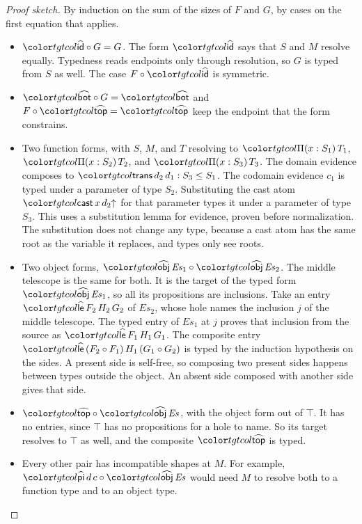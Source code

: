 \begin{proof}[Proof sketch]
By induction on the sum of the sizes of $F$ and $G$, by cases on the first equation that applies.
\begin{itemize}
\item $\form{id} \circ G = G$. The form $\form{id}$ says that $S$ and $M$ resolve equally. Typedness reads endpoints only through resolution, so $G$ is typed from $S$ as well. The case $F \circ \form{id}$ is symmetric.
\item $\form{bot} \circ G = \form{bot}$ and $F \circ \form{top} = \form{top}$ keep the endpoint that the form constrains.
\item Two function forms, with $S$, $M$, and $T$ resolving to $\pit{S_1}{T_1}$, $\pit{S_2}{T_2}$, and $\pit{S_3}{T_3}$. The domain evidence composes to $\ev{trans}\,d_2\,d_1 : S_3 \le S_1$. The codomain evidence $c_1$ is typed under a parameter of type $S_2$. Substituting the cast atom $\ev{cast}\,x\,\weak{d_2}$ for that parameter types it under a parameter of type $S_3$. This uses a substitution lemma for evidence, proven before normalization. The substitution does not change any type, because a cast atom has the same root as the variable it replaces, and types only see roots.
\item Two object forms, $\form{obj}\,\mathit{Es}_1 \circ \form{obj}\,\mathit{Es}_2$. The middle telescope is the same for both. It is the target of the typed form $\form{obj}\,\mathit{Es}_1$, so all its propositions are inclusions. Take an entry $\form{le}\,F_2\,H_2\,G_2$ of $\mathit{Es}_2$, whose hole names the inclusion $j$ of the middle telescope. The typed entry of $\mathit{Es}_1$ at $j$ proves that inclusion from the source as $\form{le}\,F_1\,H_1\,G_1$. The composite entry $\form{le}\,(F_2 \circ F_1)\,H_1\,(G_1 \circ G_2)$ is typed by the induction hypothesis on the sides. A present side is self-free, so composing two present sides happens between types outside the object. An absent side composed with another side gives that side.
\item $\form{top} \circ \form{obj}\,\mathit{Es}$, with the object form out of $\top$. It has no entries, since $\top$ has no propositions for a hole to name. So its target resolves to $\top$ as well, and the composite $\form{top}$ is typed.
\item Every other pair has incompatible shapes at $M$. For example, $\form{pi}\,d\,c \circ \form{obj}\,\mathit{Es}$ would need $M$ to resolve both to a function type and to an object type. \qedhere
\end{itemize}
\end{proof}

